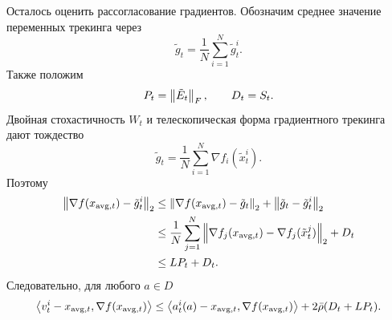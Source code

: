 Осталось оценить рассогласование градиентов.
Обозначим среднее значение переменных трекинга через
\[
    \tilde g_t=\frac{1}{N}\sum_{i=1}^{N}\tilde g_t^i.
\]
Также положим
\[
    P_t=\left\|\tilde E_t\right\|_F,
    \qquad
    D_t=S_t.
\]
Двойная стохастичность $W_t$ и телескопическая форма градиентного трекинга дают тождество
\[
    \tilde g_t
    =
    \frac{1}{N}\sum_{i=1}^{N}\nabla f_i(\tilde x_t^i).
\]
Поэтому
\[
\begin{aligned}
    \left\|\nabla f(x_{\mathrm{avg},t})-\tilde g_t^i\right\|_2
    &\leq
    \left\|\nabla f(x_{\mathrm{avg},t})-\tilde g_t\right\|_2
    +
    \left\|\tilde g_t-\tilde g_t^i\right\|_2                                      \\
    &\leq
    \frac{1}{N}\sum_{j=1}^{N}
    \left\|\nabla f_j(x_{\mathrm{avg},t})-\nabla f_j(\tilde x_t^j)\right\|_2
    +
    D_t                                                                  \\
    &\leq
    LP_t+D_t.
\end{aligned}
\]
Следовательно, для любого $a\in D$
\[
    \left\langle v_t^i-x_{\mathrm{avg},t}, \nabla f(x_{\mathrm{avg},t}) \right\rangle
    \leq
    \left\langle a_t^i(a)-x_{\mathrm{avg},t}, \nabla f(x_{\mathrm{avg},t}) \right\rangle
    +
    2\bar\rho(D_t+LP_t).
\]

